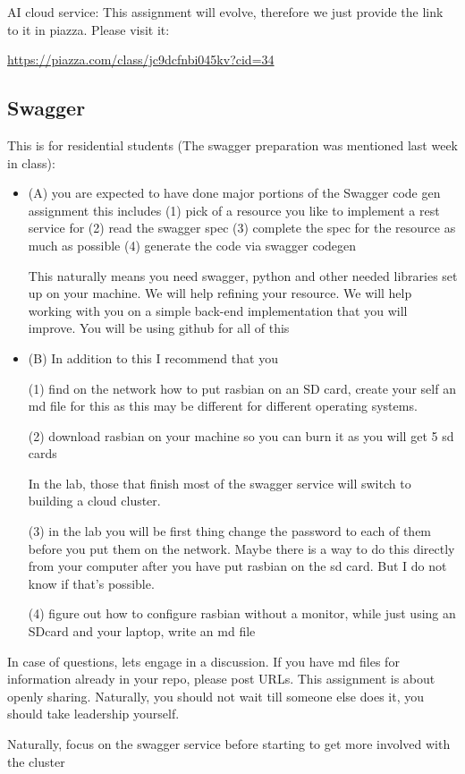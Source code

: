 \begin{exercise}

AI cloud service: This assignment will evolve, therefore we just
provide the link to it in piazza. Please visit it:

\url{https://piazza.com/class/jc9dcfnbi045kv?cid=34}
\end{exercise}

\subsection{Swagger}
\begin{exercise}
This is for residential students (The swagger preparation was mentioned last week in class):
 \begin{itemize}
\item (A) you are expected to have done major portions of the Swagger code gen assignment this includes
\subitem (1) pick of a resource you like to implement a rest service for
\subitem (2) read the swagger spec
\subitem (3) complete the spec for the resource as much as possible
\subitem (4) generate the code via swagger codegen
 
This naturally means you need swagger, python and other needed
libraries set up on your machine. We will help refining your
resource. We will help working with you on a simple back-end
implementation that you will improve. You will be using github for all
of this

\smallskip
\item (B) In addition to this I recommend that you
 
\subitem (1) find on the network how to put rasbian on an SD card,
create your self an md file for this as this may be different for
different operating systems.

 
\subitem (2) download rasbian on your machine so you can burn it as you will get 5 sd cards
 
In the lab, those that finish most of the swagger service will switch to building a cloud cluster.
 
\subitem (3) in the lab you will be first thing change the password to
each of them before you put them on the network. Maybe there is a way
to do this directly from your computer after you have put rasbian on
the sd card. But I do not know if that's possible.

 
\subitem (4) figure out how to configure rasbian without a monitor, while just using an SDcard and your laptop, write an md file

 \end{itemize}
 
In case of questions, lets engage in a discussion. If you have md
files for information already in your repo, please post URLs. This
assignment is about openly sharing. Naturally, you should not wait
till someone else does it, you should take leadership yourself.

 
Naturally, focus on the swagger service before starting to get more involved with the cluster
\end{exercise}

